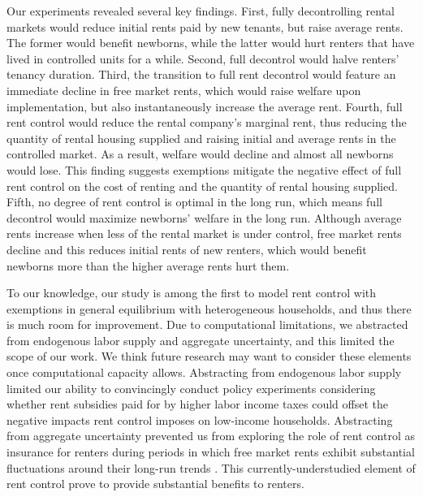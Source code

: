 \documentclass[parskip=full]{article}
\begin{document}
Our experiments revealed several key findings. First, fully decontrolling rental markets would reduce initial rents paid by new tenants, but raise average rents. The former would benefit newborns, while the latter would hurt renters that have lived in controlled units for a while. Second, full decontrol would halve renters' tenancy duration. Third, the transition to full rent decontrol would feature an immediate decline in free market rents, which would raise welfare upon implementation, but also instantaneously increase the average rent. Fourth, full rent control would reduce the rental company's marginal rent, thus reducing the quantity of rental housing supplied and raising initial and average rents in the controlled market. As a result, welfare would decline and almost all newborns would lose. This finding suggests exemptions mitigate the negative effect of full rent control on the cost of renting and the quantity of rental housing supplied. Fifth, no degree of rent control is optimal in the long run, which means full decontrol would maximize newborns' welfare in the long run. Although average rents increase when less of the rental market is under control, free market rents decline and this reduces initial rents of new renters, which would benefit newborns more than the higher average rents hurt them.

To our knowledge, our study is among the first to model rent control with exemptions in general equilibrium with heterogeneous households, and thus there is much room for improvement. Due to computational limitations, we abstracted from endogenous labor supply and aggregate uncertainty, and this limited the scope of our work. We think future research may want to consider these elements once computational capacity allows. Abstracting from endogenous labor supply limited our ability to convincingly conduct policy experiments considering whether rent subsidies paid for by higher labor income taxes could offset the negative impacts rent control imposes on low-income households. Abstracting from aggregate uncertainty prevented us from exploring the role of rent control as insurance for renters during periods in which free market rents exhibit substantial fluctuations around their long-run trends \citep{zhang-gou}. This currently-understudied element of rent control prove to provide substantial benefits to renters.



\end{document}
